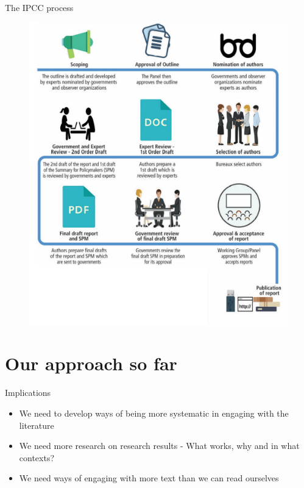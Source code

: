 \documentclass[9pt]{beamer}
\begin{document}
\begin{frame}{The IPCC process}

\begin{figure}
	\includegraphics[width=0.6\linewidth]{images/ipcc_process.png}
\end{figure}

\end{frame}


\section{Our approach so far}

\begin{frame}{Implications}

	\begin{itemize}
		\item<1-> We need to develop ways of being more systematic in engaging with the literature
		\item<2-> We need more research on research results - What works, why and in what contexts?
		\item<3-> We need ways of engaging with more text than we can read ourselves
	\end{itemize}

\end{frame}
\end{document}
